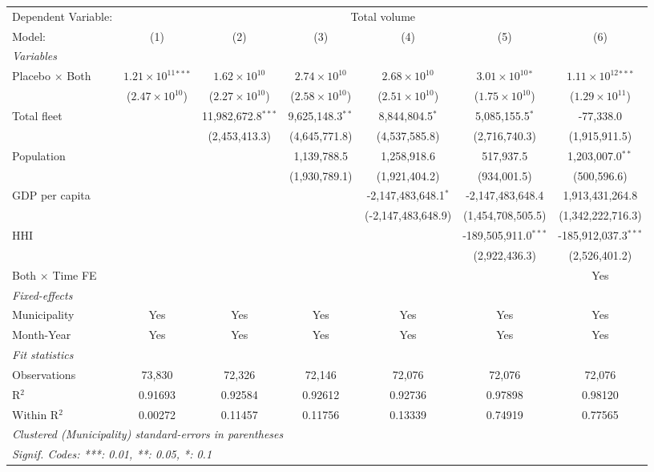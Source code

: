 \documentclass[
]{article}
\begin{document}
\begin{tabular}{lcccccc}
\tabularnewline\midrule\midrule
Dependent Variable:&\multicolumn{6}{c}{Total volume}\\
Model:&(1) & (2) & (3) & (4) & (5) & (6)\\
\midrule \emph{Variables}&   &   &   &   &   &  \\
Placebo $\times $ Both & $1.21\times 10^{11}$$^{***}$ & $1.62\times 10^{10}$ & $2.74\times 10^{10}$ & $2.68\times 10^{10}$ & $3.01\times 10^{10}$$^{*}$ & $1.11\times 10^{12}$$^{***}$\\
  &($2.47\times 10^{10}$) & ($2.27\times 10^{10}$) & ($2.58\times 10^{10}$) & ($2.51\times 10^{10}$) & ($1.75\times 10^{10}$) & ($1.29\times 10^{11}$)\\
Total fleet &    & 11,982,672.8$^{***}$ & 9,625,148.3$^{**}$ & 8,844,804.5$^{*}$ & 5,085,155.5$^{*}$ & -77,338.0\\
  &   & (2,453,413.3) & (4,645,771.8) & (4,537,585.8) & (2,716,740.3) & (1,915,911.5)\\
Population &    &    & 1,139,788.5 & 1,258,918.6 & 517,937.5 & 1,203,007.0$^{**}$\\
  &   &    & (1,930,789.1) & (1,921,404.2) & (934,001.5) & (500,596.6)\\
GDP per capita &    &    &    & -2,147,483,648.1$^{*}$ & -2,147,483,648.4 & 1,913,431,264.8\\
  &   &    &    & (-2,147,483,648.9) & (1,454,708,505.5) & (1,342,222,716.3)\\
HHI &    &    &    &    & -189,505,911.0$^{***}$ & -185,912,037.3$^{***}$\\
  &   &    &    &    & (2,922,436.3) & (2,526,401.2)\\
Both $\times$ Time FE &  &  &  &  &  & Yes\\
\midrule \emph{Fixed-effects}&   &   &   &   &   &  \\
Municipality & Yes & Yes & Yes & Yes & Yes & Yes\\
Month-Year & Yes & Yes & Yes & Yes & Yes & Yes\\
\midrule \emph{Fit statistics}&  & & & & & \\
Observations & 73,830&72,326&72,146&72,076&72,076&72,076\\
R$^2$ & 0.91693&0.92584&0.92612&0.92736&0.97898&0.98120\\
Within R$^2$ & 0.00272&0.11457&0.11756&0.13339&0.74919&0.77565\\
\midrule\midrule\multicolumn{7}{l}{\emph{Clustered (Municipality) standard-errors in parentheses}}\\
\multicolumn{7}{l}{\emph{Signif. Codes: ***: 0.01, **: 0.05, *: 0.1}}\\
\end{tabular}
\end{document}
